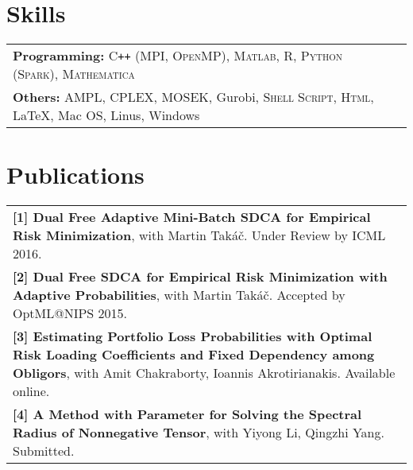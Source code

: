 \documentclass[a4paper,11pt]{article} %
\begin{document}

\section{Skills}
\begin{tabular}{l p{14.5cm}}
 \textbf{Programming:}  \textsc{C\texttt{++} (MPI, OpenMP)}, \textsc{Matlab}, \textsc{R}, \textsc{Python (Spark)}, \textsc{Mathematica}\\
 \textbf{Others:}  AMPL, CPLEX, MOSEK, Gurobi, \textsc{Shell Script}, \textsc{Html}, \LaTeX, Mac OS, Linus, Windows\\
\end{tabular}

\section{Publications}
\begin{tabular}{p{17.7cm}}
    \textbf{[1] Dual Free Adaptive Mini-Batch SDCA for Empirical Risk Minimization}, with Martin Takáč. Under Review by ICML 2016. \\ 
    \textbf{[2] Dual Free SDCA for Empirical Risk Minimization with Adaptive Probabilities}, with Martin Takáč. Accepted by OptML@NIPS 2015.\\
    \textbf{[3] Estimating Portfolio Loss Probabilities with Optimal Risk Loading Coefficients and Fixed Dependency among Obligors}, with Amit Chakraborty, Ioannis Akrotirianakis. Available online.\\
    \textbf{[4] A Method with Parameter for Solving the Spectral Radius of Nonnegative Tensor}, with Yiyong Li, Qingzhi Yang. Submitted.
\end{tabular}
\end{document}

